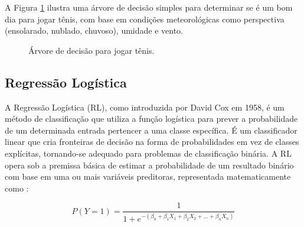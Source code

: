 A Figura \ref{fig:decision_tree} ilustra uma árvore de decisão simples para determinar se é um bom dia para jogar tênis, com base em condições meteorológicas como perspectiva (ensolarado, nublado, chuvoso), umidade e vento.

\begin{figure}[h]
\centering
{}
\caption{Árvore de decisão para jogar tênis.}
\label{fig:decision_tree}
\end{figure}

\subsection{Regressão Logística}

A Regressão Logística (RL), como introduzida por David Cox em 1958, é um método de classificação que utiliza a função logística para prever a probabilidade de um determinada entrada pertencer a uma classe específica. É um classificador linear que cria fronteiras de decisão na forma de probabilidades em vez de classes explícitas, tornando-se adequado para problemas de classificação binária. A RL opera sob a premissa básica de estimar a probabilidade de um resultado binário com base em uma ou mais variáveis preditoras, representada matematicamente como \cite{kowsari2019text}:

\[ P(Y=1) = \frac{1}{1 + e^{-(\beta_0 + \beta_1X_1 + \beta_2X_2 + ... + \beta_nX_n)}} \]

